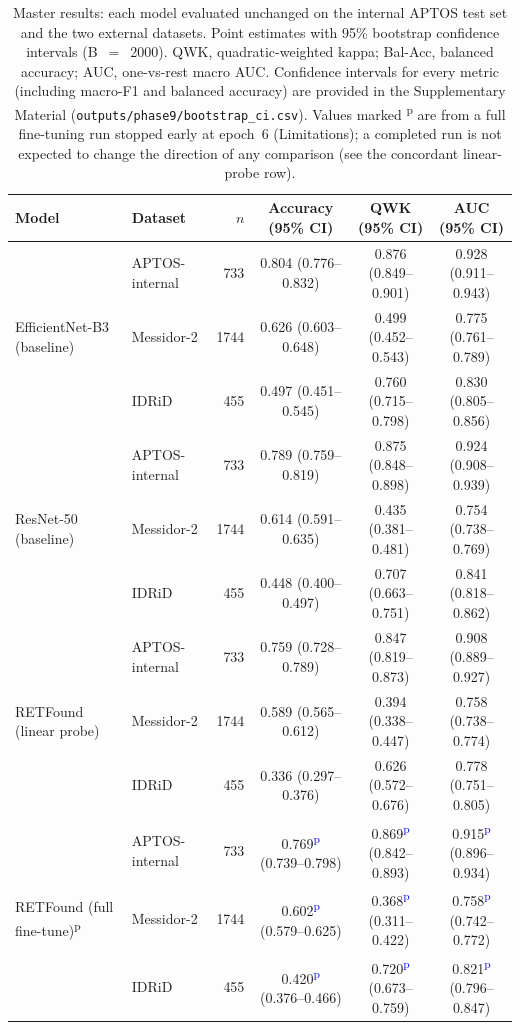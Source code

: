 \documentclass[11pt,a4paper]{article}
\newcommand{\prov}[1]{#1\textsuperscript{\textcolor{blue}{p}}} %
\begin{document}
\begin{table}[t]
\centering
\caption{Master results: each model evaluated unchanged on the internal APTOS
test set and the two external datasets. Point estimates with 95\% bootstrap
confidence intervals (B~$=$~2000). QWK, quadratic-weighted kappa; Bal-Acc,
balanced accuracy; AUC, one-vs-rest macro AUC. Confidence intervals for every
metric (including macro-F1 and balanced accuracy) are provided in the
Supplementary Material (\texttt{outputs/phase9/bootstrap\_ci.csv}). Values marked
\textsuperscript{p} are from a full fine-tuning run stopped early at epoch~6
(Limitations); a completed run is not expected to change the direction of any
comparison (see the concordant linear-probe row).}
\label{tab:master}
\footnotesize
\setlength{\tabcolsep}{4pt}
\begin{tabular}{llrccc}
\toprule
Model & Dataset & $n$ & Accuracy (95\% CI) & QWK (95\% CI) & AUC (95\% CI) \\
\midrule
\multirow{3}{*}{EfficientNet-B3 (baseline)}
 & APTOS-internal & 733  & 0.804 (0.776--0.832) & 0.876 (0.849--0.901) & 0.928 (0.911--0.943) \\
 & Messidor-2     & 1744 & 0.626 (0.603--0.648) & 0.499 (0.452--0.543) & 0.775 (0.761--0.789) \\
 & IDRiD          & 455  & 0.497 (0.451--0.545) & 0.760 (0.715--0.798) & 0.830 (0.805--0.856) \\
\midrule
\multirow{3}{*}{ResNet-50 (baseline)}
 & APTOS-internal & 733  & 0.789 (0.759--0.819) & 0.875 (0.848--0.898) & 0.924 (0.908--0.939) \\
 & Messidor-2     & 1744 & 0.614 (0.591--0.635) & 0.435 (0.381--0.481) & 0.754 (0.738--0.769) \\
 & IDRiD          & 455  & 0.448 (0.400--0.497) & 0.707 (0.663--0.751) & 0.841 (0.818--0.862) \\
\midrule
\multirow{3}{*}{RETFound (linear probe)}
 & APTOS-internal & 733  & 0.759 (0.728--0.789) & 0.847 (0.819--0.873) & 0.908 (0.889--0.927) \\
 & Messidor-2     & 1744 & 0.589 (0.565--0.612) & 0.394 (0.338--0.447) & 0.758 (0.738--0.774) \\
 & IDRiD          & 455  & 0.336 (0.297--0.376) & 0.626 (0.572--0.676) & 0.778 (0.751--0.805) \\
\midrule
\multirow{3}{*}{RETFound (full fine-tune)\textsuperscript{p}}
 & APTOS-internal & 733  & \prov{0.769} (0.739--0.798) & \prov{0.869} (0.842--0.893) & \prov{0.915} (0.896--0.934) \\
 & Messidor-2     & 1744 & \prov{0.602} (0.579--0.625) & \prov{0.368} (0.311--0.422) & \prov{0.758} (0.742--0.772) \\
 & IDRiD          & 455  & \prov{0.420} (0.376--0.466) & \prov{0.720} (0.673--0.759) & \prov{0.821} (0.796--0.847) \\
\bottomrule
\end{tabular}
\end{table}
\end{document}
